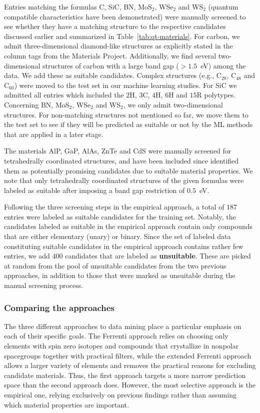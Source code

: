 \documentclass[superscriptaddress,unsortedaddress,
 amsmath,amssymb,
 aps,
]{revtex4-2}
\begin{document}
Entries matching the formulas C, SiC, BN, MoS$_2$, WSe$_2$ and WS$_2$ (quantum compatible characteristics have been demonstrated) were manually screened to see whether they have a matching structure to the respective candidates discussed earlier and summarized in Table~\ref{tab:qt-materials}. 
For carbon, we admit three-dimensional diamond-like structures as explicitly stated in the column tags from the Materials Project. Additionally, we find several two-dimensional structures of carbon with a large band gap ($>1.5$~eV) among the data. We add these as suitable candidates. Complex structures (e.g., C$_{28}$, C$_{48}$ and C$_{60}$) were moved to the test set in our machine learning studies. For SiC we admitted all entries which included the $2$H, $3$C, $4$H, $6$H and $15$R polytypes. Concerning BN, MoS$_2$, WSe$_2$ and WS$_2$, we only admit two-dimensional structures. For non-matching structures not mentioned so far, we move them to the test set to see if they will be predicted as suitable or not by the ML methods that are applied in a later stage.

The materials AlP, GaP, AlAs, ZnTe and CdS were manually screened for tetrahedrally coordinated structures, and have been included since \citeauthor{Weber2010} \cite{Weber2010} identified them as potentially promising candidates due to suitable material properties. 
We note that only tetrahedrally coordinated structures of the given formulas were labeled as suitable after imposing a band gap restriction of $0.5$~eV. 

Following the three screening steps in the empirical approach, a total of $187$ entries were labeled as suitable candidates for the training set. 
Notably, the candidates labeled as suitable in the empirical approach contain only compounds that are either elementary (unary) or binary. 
Since the set of labeled data constituting suitable candidates in the empirical approach contains rather few entries, we add $400$ candidates that are labeled as \textbf{unsuitable}. These are picked at random from the pool of unsuitable candidates from the two previous approaches, in addition to those that were marked as unsuitable during the manual screening process. 

\subsubsection*{Comparing the approaches}
The three different approaches to data mining place a particular emphasis on each of their specific goals. The Ferrenti approach relies on choosing only elements with spin zero isotopes and compounds that crystallize in nonpolar spacegroups together with practical filters, while the extended Ferrenti approach allows a larger variety of elements and removes the practical reasons for excluding candidate materials. Thus, the first approach targets a more narrow prediction space than the second approach does. However, the most selective approach is the empirical one, relying exclusively on previous findings rather than assuming which material properties are important. 
\end{document}

